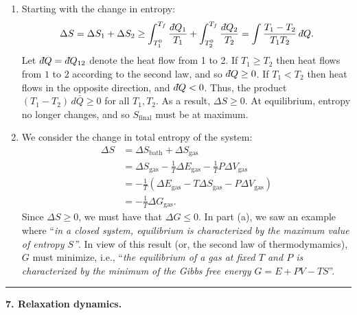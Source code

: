 \documentclass{article}
\theoremstyle{definition}
\def\dbar{{\mkern3mu\mathchar'26\mkern-12mu   d}}
\newcommand{\f}[2]{\frac{#1}{#2}}
\newcommand{\lp}{\left(}
\newcommand{\rp}{\right)}
\begin{document}
\begin{enumerate}[label=(\alph*)]
	\item Starting with the change in entropy:
	\begin{equation*}
	\Delta S = \Delta S_1 + \Delta S_2 \geq \int^{T_f}_{T_1^0} \f{\dbar Q_1}{T_1} + \int^{T_f}_{T_2^0} \f{\dbar Q_2}{T_2} = \int \f{T_1 - T_2}{T_1T_2}\,\dbar Q.
	\end{equation*}
	Let $\dbar Q = \dbar Q_{12}$ denote the heat flow from 1 to 2. If $T_1 \geq T_2$ then heat flows from $1$ to $2$ according to the second law, and so $\dbar Q \geq 0$. If $T_1 < T_2$ then heat flows in the opposite direction, and $\dbar Q < 0$. Thus, the product $(T_1-T_2)\,d\bar Q \geq 0$ for all $T_1, T_2$. As a result, $\Delta S \geq 0$.  At equilibrium, entropy no longer changes, and so $S_\text{final}$ must be at maximum.
	
	\item We consider the change in total entropy of the system:
	\begin{align*}
	\Delta S &= \Delta S_\text{bath} + \Delta S_{\text{gas}} \\
	&= \Delta S_\text{gas} - \f{1}{T} \Delta E_\text{gas} - \f{1}{T}P\Delta V_\text{gas}\\
	&= -\f{1}{T}\lp \Delta E_\text{gas} -  T\Delta S_\text{gas} - P\Delta V_\text{gas}  \rp \\
	&= -\f{1}{T} \Delta G_\text{gas}.
	\end{align*}
	Since $\Delta S \geq 0$, we must have that $\Delta G \leq 0$. In part (a), we saw an example where ``\textit{in a closed system, equilibrium is characterized by the maximum value of entropy $S$''}. In view of this result (or, the second law of thermodymamics), $G$ must minimize, i.e., ``\textit{the equilibrium of a gas at fixed $T$ and $P$ is characterized by the minimum of the Gibbs free energy $G = E + PV - TS$}''.
\end{enumerate}



\hrule


$\,$\\


\noindent \textbf{7. Relaxation dynamics.}
\end{document}
